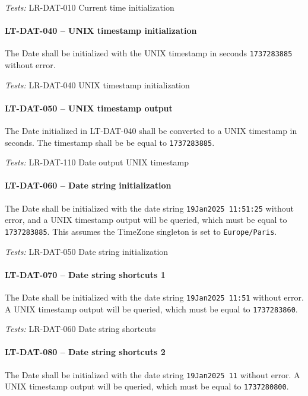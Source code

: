 \textit{Tests: } LR-DAT-010 Current time initialization

\paragraph{LT-DAT-040 -- UNIX timestamp initialization}
The Date shall be initialized with the UNIX timestamp in seconds
\lstinline{1737283885} without error.

\textit{Tests: } LR-DAT-040 UNIX timestamp initialization

\paragraph{LT-DAT-050 -- UNIX timestamp output}
The Date initialized in LT-DAT-040 shall be converted to a UNIX
timestamp in seconds. The timestamp shall be be equal to \lstinline{1737283885}.

\textit{Tests: } LR-DAT-110 Date output UNIX timestamp

\paragraph{LT-DAT-060 -- Date string initialization}
The Date shall be initialized with the date string
\lstinline{19Jan2025 11:51:25} without error, and a UNIX timestamp output
will be queried, which must be equal to \lstinline{1737283885}.
This assumes the TimeZone singleton is set to \lstinline{Europe/Paris}.

\textit{Tests: } LR-DAT-050 Date string initialization

\paragraph{LT-DAT-070 -- Date string shortcuts 1}
The Date shall be initialized with the date string
\lstinline{19Jan2025 11:51} without error.
A UNIX timestamp output will be queried, which must be equal to
\lstinline{1737283860}.

\textit{Tests: } LR-DAT-060 Date string shortcuts

\paragraph{LT-DAT-080 -- Date string shortcuts 2}
The Date shall be initialized with the date string
\lstinline{19Jan2025 11} without error.
A UNIX timestamp output will be queried, which must be equal to
\lstinline{1737280800}.

